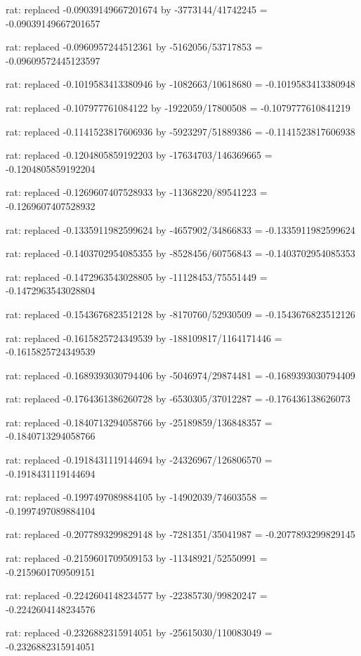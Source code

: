 \documentclass[a4paper,10pt]{article}
\begin{document}
\begin{eulernotebook}
\begin{eulercomment}
\begin{eulercomment}
\begin{eulercomment}
\begin{eulercomment}
\begin{eulercomment}
\begin{eulercomment}
\begin{eulercomment}
\begin{eulercomment}
\begin{eulercomment}
\begin{eulercomment}
\begin{eulercomment}
\begin{eulercomment}
\begin{eulercomment}
\begin{eulercomment}
\begin{eulercomment}
\begin{eulercomment}
\begin{euleroutput}
  rat: replaced -0.09039149667201674 by -3773144/41742245 = -0.09039149667201657
  
  rat: replaced -0.0960957244512361 by -5162056/53717853 = -0.09609572445123597
  
  rat: replaced -0.1019583413380946 by -1082663/10618680 = -0.1019583413380948
  
  rat: replaced -0.107977761084122 by -1922059/17800508 = -0.1079777610841219
  
  rat: replaced -0.1141523817606936 by -5923297/51889386 = -0.1141523817606938
  
  rat: replaced -0.1204805859192203 by -17634703/146369665 = -0.1204805859192204
  
  rat: replaced -0.1269607407528933 by -11368220/89541223 = -0.1269607407528932
  
  rat: replaced -0.1335911982599624 by -4657902/34866833 = -0.1335911982599624
  
  rat: replaced -0.1403702954085355 by -8528456/60756843 = -0.1403702954085353
  
  rat: replaced -0.1472963543028805 by -11128453/75551449 = -0.1472963543028804
  
  rat: replaced -0.1543676823512128 by -8170760/52930509 = -0.1543676823512126
  
  rat: replaced -0.1615825724349539 by -188109817/1164171446 = -0.1615825724349539
  
  rat: replaced -0.1689393030794406 by -5046974/29874481 = -0.1689393030794409
  
  rat: replaced -0.1764361386260728 by -6530305/37012287 = -0.176436138626073
  
  rat: replaced -0.1840713294058766 by -25189859/136848357 = -0.1840713294058766
  
  rat: replaced -0.1918431119144694 by -24326967/126806570 = -0.1918431119144694
  
  rat: replaced -0.1997497089884105 by -14902039/74603558 = -0.1997497089884104
  
  rat: replaced -0.2077893299829148 by -7281351/35041987 = -0.2077893299829145
  
  rat: replaced -0.2159601709509153 by -11348921/52550991 = -0.2159601709509151
  
  rat: replaced -0.2242604148234577 by -22385730/99820247 = -0.2242604148234576
  
  rat: replaced -0.2326882315914051 by -25615030/110083049 = -0.2326882315914051
  

\end{euleroutput}
\end{eulercomment}
\end{eulercomment}
\end{eulercomment}
\end{eulercomment}
\end{eulercomment}
\end{eulercomment}
\end{eulercomment}
\end{eulercomment}
\end{eulercomment}
\end{eulercomment}
\end{eulercomment}
\end{eulercomment}
\end{eulercomment}
\end{eulercomment}
\end{eulercomment}
\end{eulercomment}
\end{eulernotebook}
\end{document}

